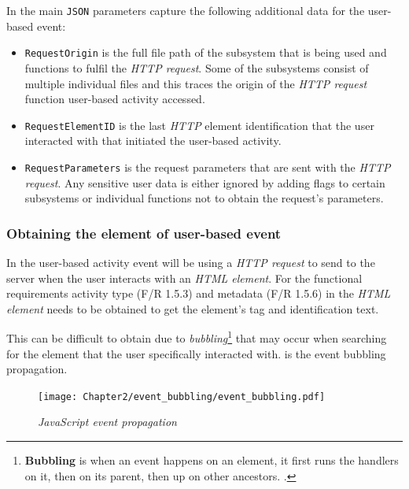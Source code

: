 In  the main \texttt{JSON} parameters capture the following additional data for the user-based event:

\begin{itemize}
	\item \texttt{RequestOrigin} is the full file path of the subsystem that is being used and functions to fulfil the \textit{HTTP request}. Some of the subsystems consist of multiple individual files and this traces the origin of the \textit{HTTP request} function user-based activity accessed.
	\item \texttt{RequestElementID} is the last \textit{HTTP} element identification that the user interacted with that initiated the user-based activity.
	\item \texttt{RequestParameters} is the request parameters that are sent with the \textit{HTTP request}. Any sensitive user data is either ignored by adding flags to certain subsystems or individual functions not to obtain the request's parameters.
\end{itemize}

\subsubsection{Obtaining the element of user-based event}\label{sec:ch3_ElementObtaining}
In  the user-based activity event will be using a \textit{HTTP request} to send to the server when the user interacts with an \textit{HTML element}. For the functional requirements activity type (F/R 1.5.3) and metadata (F/R 1.5.6) in  the \textit{HTML element} needs to be obtained to get the element's tag and identification text.\par This can be difficult to obtain due to \textit{bubbling}\footnote{\textbf{Bubbling} is when an event happens on an element, it first runs the handlers on it, then on its parent, then up on other ancestors. \cite{EventBubbling}.} that may occur when searching for the element that the user specifically interacted with.  is the event bubbling propagation.

\begin{figure}[!htb]
	\centering %
	\texttt{[image: Chapter2/event\_bubbling/event\_bubbling.pdf]}
	\caption[JavaScript event propagation]
	{\textit{JavaScript event propagation~\cite{EventBubbling}}}\label{fig:ch2_event_bubbling}
\end{figure}


